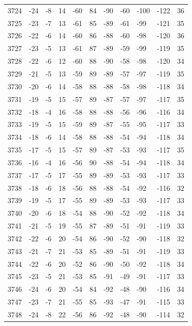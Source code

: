\begin{table}[H]
\begin{tabular}{lllllllllll}
3724 & -24 & -8 & 14 & -60 & 84 & -90 & -60 & -100 & -122 & 36 \\
3725 & -23 & -7 & 13 & -61 & 85 & -89 & -61 & -99 & -121 & 35 \\
3726 & -22 & -6 & 14 & -60 & 86 & -88 & -60 & -98 & -120 & 36 \\
3727 & -23 & -5 & 13 & -61 & 87 & -89 & -59 & -99 & -119 & 35 \\
3728 & -22 & -6 & 12 & -60 & 88 & -90 & -58 & -98 & -120 & 34 \\
3729 & -21 & -5 & 13 & -59 & 89 & -89 & -57 & -97 & -119 & 35 \\
3730 & -20 & -6 & 14 & -58 & 88 & -88 & -58 & -98 & -118 & 34 \\
3731 & -19 & -5 & 15 & -57 & 89 & -87 & -57 & -97 & -117 & 35 \\
3732 & -18 & -4 & 16 & -58 & 88 & -88 & -56 & -96 & -116 & 34 \\
3733 & -19 & -5 & 15 & -59 & 89 & -87 & -55 & -95 & -117 & 33 \\
3734 & -18 & -6 & 14 & -58 & 88 & -88 & -54 & -94 & -118 & 34 \\
3735 & -17 & -5 & 15 & -57 & 89 & -87 & -53 & -93 & -117 & 35 \\
3736 & -16 & -4 & 16 & -56 & 90 & -88 & -54 & -94 & -118 & 34 \\
3737 & -17 & -5 & 17 & -55 & 89 & -89 & -53 & -93 & -117 & 33 \\
3738 & -18 & -6 & 18 & -56 & 88 & -88 & -54 & -92 & -116 & 32 \\
3739 & -19 & -5 & 17 & -55 & 89 & -89 & -53 & -93 & -117 & 33 \\
3740 & -20 & -6 & 18 & -54 & 88 & -90 & -52 & -92 & -118 & 34 \\
3741 & -21 & -5 & 19 & -55 & 87 & -89 & -51 & -91 & -119 & 33 \\
3742 & -22 & -6 & 20 & -54 & 86 & -90 & -52 & -90 & -118 & 32 \\
3743 & -21 & -7 & 21 & -53 & 85 & -89 & -51 & -91 & -119 & 33 \\
3744 & -22 & -6 & 20 & -52 & 86 & -90 & -50 & -92 & -118 & 34 \\
3745 & -23 & -5 & 21 & -53 & 85 & -91 & -49 & -91 & -117 & 33 \\
3746 & -24 & -6 & 20 & -54 & 84 & -92 & -48 & -90 & -116 & 34 \\
3747 & -23 & -7 & 21 & -55 & 85 & -93 & -47 & -91 & -115 & 33 \\
3748 & -24 & -8 & 22 & -56 & 86 & -92 & -48 & -90 & -114 & 32 \\

\end{tabular}
\end{table}
